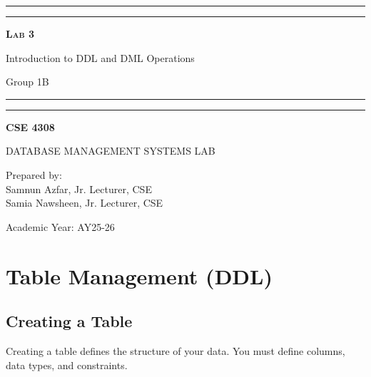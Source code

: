 \documentclass[12pt,a4paper]{article}
\begin{document}
\begin{titlepage}
    \centering
    \vspace*{2\baselineskip}

    \rule{14cm}{2pt}\vspace*{-0.8\baselineskip}\vspace*{1.5pt}
    \rule{14cm}{0.5pt}\vspace{2\baselineskip}

    {\Huge\bfseries\scshape Lab 3\par}
    \vspace{3mm}
    {\Large Introduction to DDL and DML Operations\par}
    \vspace{2mm}
    {\large Group 1B\par}
    \vspace{3mm}

    \rule{14cm}{0.5pt}\vspace*{-0.7\baselineskip}\vspace{2.5pt}
    \rule{14cm}{2pt}

    \vspace{2\baselineskip}

    {\Large\bfseries CSE 4308\par}
    \vspace{1\baselineskip}
    {\large DATABASE MANAGEMENT SYSTEMS LAB\par}

    \vfill
    {\normalsize Prepared by:\\ Samnun Azfar, Jr. Lecturer, CSE\\ Samia Nawsheen, Jr. Lecturer, CSE\par}
    {\normalsize Academic Year: AY25-26\par}
\end{titlepage}

\newpage

\section{Table Management (DDL)}

\subsection{Creating a Table}
Creating a table defines the structure of your data. You must define columns, data types, and constraints.
\end{document}
